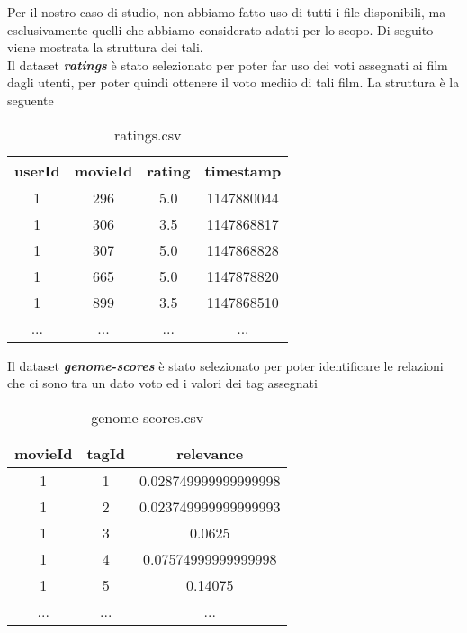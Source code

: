 \documentclass[../../Report.tex]{subfiles}
\begin{document}
Per il nostro caso di studio, non abbiamo fatto uso di tutti i file disponibili, ma esclusivamente quelli che abbiamo considerato adatti per lo scopo.
Di seguito viene mostrata la struttura dei tali.
\\
Il dataset \textit{\textbf{ratings}} è stato selezionato per poter far uso dei voti assegnati ai film dagli utenti, per poter quindi ottenere il voto mediio di tali film.
La struttura è la seguente
\begin{table}[H]
    \centering
    \begin{tabular}{|c|c|c|c|}
        \hline
        \textbf{userId} & \textbf{movieId} & \textbf{rating} & \textbf{timestamp} \\
        \hline
        1               & 296              & 5.0             & 1147880044         \\
        1               & 306              & 3.5             & 1147868817         \\
        1               & 307              & 5.0             & 1147868828         \\
        1               & 665              & 5.0             & 1147878820         \\
        1               & 899              & 3.5             & 1147868510         \\
        ...             & ...              & ...             & ...                \\
        \hline
    \end{tabular}
    \caption{ratings.csv}
    \label{tab:ratings_csv}
\end{table}

Il dataset \textit{\textbf{genome-scores}} è stato selezionato per poter identificare le relazioni che ci sono tra un dato voto ed i valori dei tag assegnati
\begin{table}[H]
    \centering
    \begin{tabular}{|c|c|c|}
        \hline
        \textbf{movieId} & \textbf{tagId} & \textbf{relevance}   \\
        \hline
        1                & 1              & 0.028749999999999998 \\
        1                & 2              & 0.023749999999999993 \\
        1                & 3              & 0.0625               \\
        1                & 4              & 0.07574999999999998  \\
        1                & 5              & 0.14075              \\
        ...              & ...            & ...                  \\
        \hline
    \end{tabular}
    \caption{genome-scores.csv}
    \label{tab:genome-scores_csv}
\end{table}
\end{document}

